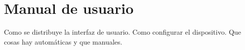 \section{Manual de usuario}\label{sec:manual}

Como se distribuye la interfaz de usuario. Como configurar el dispositivo. Que cosas hay automáticas y que manuales. 